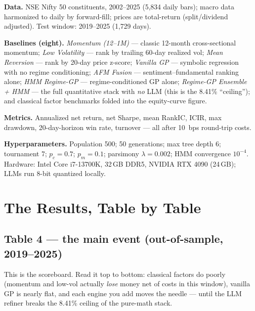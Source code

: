 \documentclass[11pt,a4paper]{article}
\begin{document}
\textbf{Data.} NSE Nifty 50 constituents, 2002--2025 (5{,}834 daily bars);
macro data harmonized to daily by forward-fill; prices are total-return
(split/dividend adjusted). Test window: 2019--2025 (1{,}729 days).

\textbf{Baselines (eight).} \emph{Momentum (12--1M)} --- classic 12-month
cross-sectional momentum; \emph{Low Volatility} --- rank by trailing 60-day
realized vol; \emph{Mean Reversion} --- rank by 20-day price z-score;
\emph{Vanilla GP} --- symbolic regression with no regime conditioning;
\emph{AFM Fusion} --- sentiment--fundamental ranking alone;
\emph{HMM Regime-GP} --- regime-conditioned GP alone;
\emph{Regime-GP Ensemble + HMM} --- the full quantitative stack with
\emph{no} LLM (this is the 8.41\% ``ceiling''); and classical factor
benchmarks folded into the equity-curve figure.

\textbf{Metrics.} Annualized net return, net Sharpe, mean RankIC, ICIR, max
drawdown, 20-day-horizon win rate, turnover --- all after 10~bps round-trip
costs.

\textbf{Hyperparameters.} Population 500; 50 generations; max tree depth 6;
tournament 7; $p_c=0.7$; $p_m=0.1$; parsimony $\lambda = 0.002$; HMM
convergence $10^{-4}$. Hardware: Intel Core i7-13700K, 32\,GB DDR5, NVIDIA
RTX 4090 (24\,GB); LLMs run 8-bit quantized locally.

\section{The Results, Table by Table}
\label{sec:results}

\subsection{Table 4 --- the main event (out-of-sample, 2019--2025)}

\begin{plaineng}
This is the scoreboard. Read it top to bottom: classical factors do poorly
(momentum and low-vol actually \emph{lose} money net of costs in this
window), vanilla GP is nearly flat, and each engine you add moves the needle
--- until the LLM refiner breaks the 8.41\% ceiling of the pure-math stack.
\end{plaineng}
\end{document}
